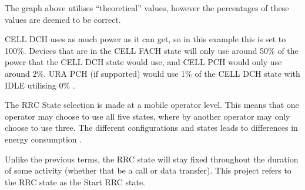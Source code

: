 The graph above utilises ``theoretical'' values, however the percentages of 
these values are deemed to be correct. 

CELL DCH uses as much power as it can get, so in this example this is set to 
100\%. Devices that are in the CELL FACH state will only use around 50\% of the
power that the CELL DCH state would use, and CELL PCH would only use around 
2\%. URA PCH (if supported) would use 1\% of the CELL DCH state with IDLE 
utilising 0\% \citep{umtsworld}.

The RRC State selection is made at a mobile operator level. This means that one 
operator may choose to use all five states, where by another operator may only 
choose to use three. The different configurations and states leads to 
differences in energy consumption \citep{umtsworld}.

Unlike the previous terms, the RRC state will stay fixed throughout the 
duration of some activity (whether that be a call or data transfer). This 
project refers to the RRC state as the Start RRC state.